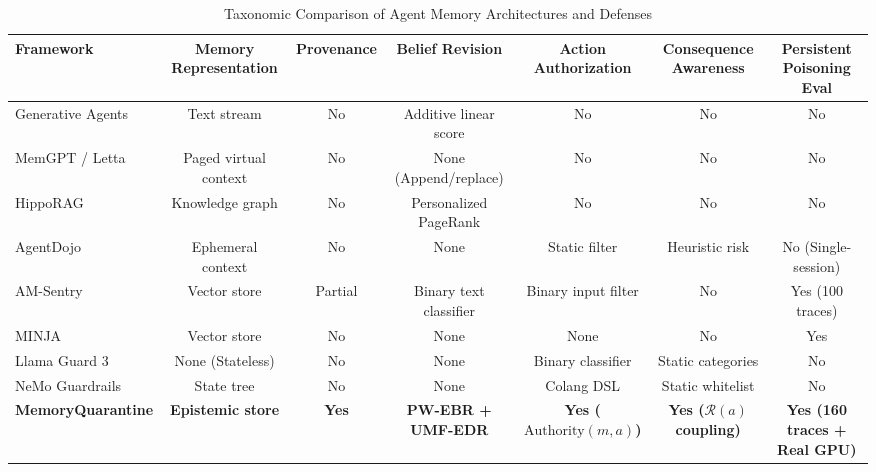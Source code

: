 \begin{table}[!t]
\centering
\caption{Taxonomic Comparison of Agent Memory Architectures and Defenses}
\label{tab:related_work}
\begin{tabularx}{\textwidth}{lcccccc}
\toprule
\textbf{Framework} & \textbf{Memory Representation} & \textbf{Provenance} & \textbf{Belief Revision} & \textbf{Action Authorization} & \textbf{Consequence Awareness} & \textbf{Persistent Poisoning Eval} \\
\midrule
Generative Agents~\cite{park2023generative} & Text stream & No & Additive linear score & No & No & No \\
MemGPT / Letta~\cite{packer2023memgpt} & Paged virtual context & No & None (Append/replace) & No & No & No \\
HippoRAG~\cite{bernal2024hipporag} & Knowledge graph & No & Personalized PageRank & No & No & No \\
AgentDojo~\cite{debenedetti2024agentdojo} & Ephemeral context & No & None & Static filter & Heuristic risk & No (Single-session) \\
AM-Sentry~\cite{torres2026ghostwriter} & Vector store & Partial & Binary text classifier & Binary input filter & No & Yes (100 traces) \\
MINJA~\cite{dong2024minja} & Vector store & No & None & None & No & Yes \\
Llama Guard 3~\cite{inan2023llamaguard} & None (Stateless) & No & None & Binary classifier & Static categories & No \\
NeMo Guardrails~\cite{rebedea2023nemo} & State tree & No & None & Colang DSL & Static whitelist & No \\
\textbf{MemoryQuarantine} & \textbf{Epistemic store} & \textbf{Yes} & \textbf{PW-EBR + UMF-EDR} & \textbf{Yes ($\text{Authority}(m,a)$)} & \textbf{Yes ($\mathcal{R}(a)$ coupling)} & \textbf{Yes (160 traces + Real GPU)} \\
\bottomrule
\end{tabularx}
\end{table}
